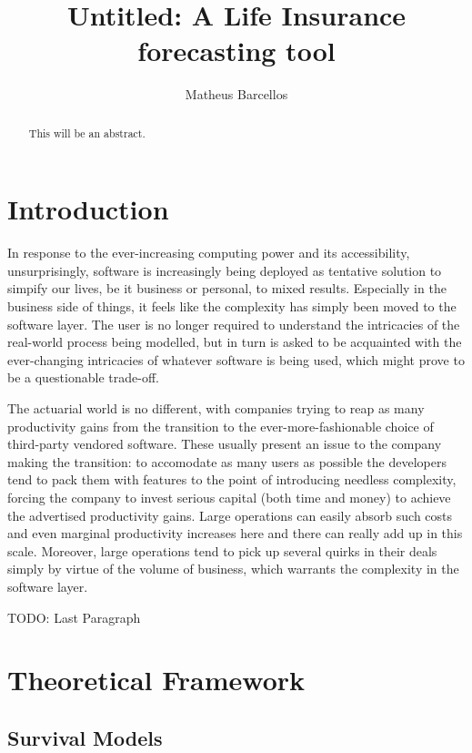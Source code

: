 \documentclass[a4paper]{report}
\title{Untitled: A Life Insurance forecasting tool}
\author{Matheus Barcellos}
\begin{document}
  \maketitle  

  \begin{abstract}
    This will be an abstract.
  \end{abstract}

  \tableofcontents

  \chapter*{Introduction}
  
  In response to the ever-increasing computing power and its
   accessibility, unsurprisingly, software is increasingly 
  being deployed as tentative solution to simpify our lives,
   be it business or personal, to mixed results.
  Especially in the business side of things, it feels like 
  the complexity has simply been moved to the software 
  layer.
  The user is no longer required to understand the 
  intricacies of the real-world process being modelled, 
  but in turn is asked to be acquainted with the 
  ever-changing intricacies of whatever software is being 
  used, which might prove to be a questionable trade-off.
  
  The actuarial world is no different, 
  with companies trying to reap as many productivity gains 
  from the transition to the ever-more-fashionable choice 
  of third-party vendored software.
  These usually present an issue to the company making the 
  transition: to accomodate as many users as possible 
  the developers tend to pack them with features to the 
  point of introducing needless complexity, forcing the 
  company to invest serious capital (both time and money) 
  to achieve the advertised productivity gains.
  Large operations can easily absorb such costs and even 
  marginal productivity increases here and there can really 
  add up in this scale. Moreover, large operations tend to 
  pick up several quirks in their deals simply by virtue of 
  the volume of business, which warrants the complexity in 
  the software layer.
 
  TODO: Last Paragraph

  \chapter{Theoretical Framework}

    \section{Survival Models}
\end{document}

